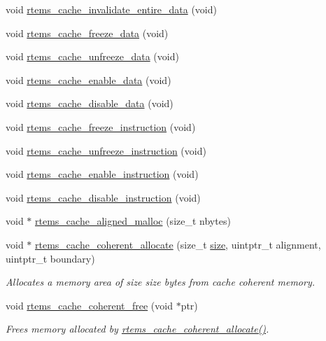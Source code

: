 \begin{DoxyCompactItemize}
void \mbox{\hyperlink{group__ClassicCache_ga2e97de1f20e4309fc47122606f466432}{rtems\+\_\+cache\+\_\+invalidate\+\_\+entire\+\_\+data}} (void)
\item 
void \mbox{\hyperlink{group__ClassicCache_gaf752a10d977abc9a1d1e01c7c0bcdd67}{rtems\+\_\+cache\+\_\+freeze\+\_\+data}} (void)
\item 
void \mbox{\hyperlink{group__ClassicCache_ga7b374f428ad0e3e1d73250c5186a945e}{rtems\+\_\+cache\+\_\+unfreeze\+\_\+data}} (void)
\item 
void \mbox{\hyperlink{group__ClassicCache_ga529dbf2f354951145a4cdc50e4ef9e21}{rtems\+\_\+cache\+\_\+enable\+\_\+data}} (void)
\item 
void \mbox{\hyperlink{group__ClassicCache_ga60fb68aba331040c536e8ab238d2f5f3}{rtems\+\_\+cache\+\_\+disable\+\_\+data}} (void)
\item 
void \mbox{\hyperlink{group__ClassicCache_ga96846fa3b086443bde950a491b9d4d90}{rtems\+\_\+cache\+\_\+freeze\+\_\+instruction}} (void)
\item 
void \mbox{\hyperlink{group__ClassicCache_ga4a0de41a4992edaa25daa72e7c7494e7}{rtems\+\_\+cache\+\_\+unfreeze\+\_\+instruction}} (void)
\item 
void \mbox{\hyperlink{group__ClassicCache_gaf8c11725044ff1612a412984fa9ed599}{rtems\+\_\+cache\+\_\+enable\+\_\+instruction}} (void)
\item 
void \mbox{\hyperlink{group__ClassicCache_ga568ced5f7d37af19cc883e3f241eb143}{rtems\+\_\+cache\+\_\+disable\+\_\+instruction}} (void)
\item 
void $\ast$ \mbox{\hyperlink{group__ClassicCache_ga29c16023024c824dbf76a11539c921d1}{rtems\+\_\+cache\+\_\+aligned\+\_\+malloc}} (size\+\_\+t nbytes)
\item 
void $\ast$ \mbox{\hyperlink{group__ClassicCache_ga026115893a08faf480fec18555ce6c26}{rtems\+\_\+cache\+\_\+coherent\+\_\+allocate}} (size\+\_\+t \mbox{\hyperlink{sun4u_2tte_8h_a245260f6f74972558f61b85227df5aae}{size}}, uintptr\+\_\+t alignment, uintptr\+\_\+t boundary)
\begin{DoxyCompactList}\small\item\em Allocates a memory area of size {\itshape size} bytes from cache coherent memory. \end{DoxyCompactList}\item 
void \mbox{\hyperlink{group__ClassicCache_gac7d03457fcfb79a8c7ffe530c91118c9}{rtems\+\_\+cache\+\_\+coherent\+\_\+free}} (void $\ast$ptr)
\begin{DoxyCompactList}\small\item\em Frees memory allocated by \mbox{\hyperlink{group__ClassicCache_ga026115893a08faf480fec18555ce6c26}{rtems\+\_\+cache\+\_\+coherent\+\_\+allocate()}}. \end{DoxyCompactList}\item 

\end{DoxyCompactItemize}
